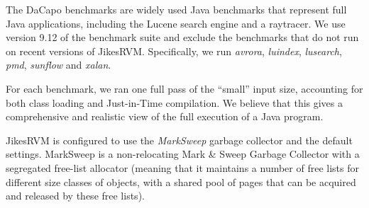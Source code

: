 
The DaCapo benchmarks are widely used Java benchmarks that represent full Java
applications, including the Lucene search engine and a raytracer. We use
version 9.12 of the benchmark suite and exclude the benchmarks that do not run
on recent versions of JikesRVM. Specifically, we run \emph{avrora},
\emph{luindex}, \emph{lusearch}, \emph{pmd}, \emph{sunflow} and \emph{xalan}.

For each benchmark, we ran one full pass of the ``small'' input size,
accounting for both class loading and Just-in-Time compilation. We believe that
this gives a comprehensive and realistic view of the full execution of a Java
program.

JikesRVM is configured to use the \emph{MarkSweep} garbage collector and the
default settings. MarkSweep is a non-relocating Mark \& Sweep Garbage Collector
with a segregated free-list allocator (meaning that it maintains a number of
free lists for different size classes of objects, with a shared pool of pages
that can be acquired and released by these free lists).
